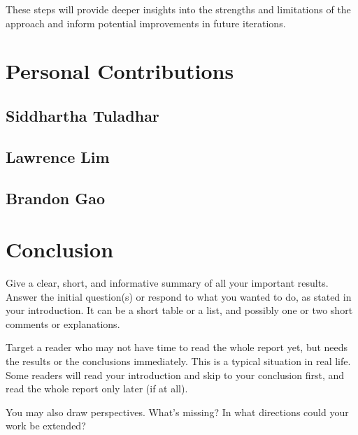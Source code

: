 \documentclass{scrartcl}
\begin{document}
These steps will provide deeper insights into the strengths and limitations of the approach and inform potential improvements in future iterations.


\section{Personal Contributions}

\subsection{Siddhartha Tuladhar}

\subsection{Lawrence Lim}

\subsection{Brandon Gao}

\section{Conclusion}

Give a clear, short, and informative summary of all your important results. Answer the initial question(s) or respond to what you wanted to do, as stated in your introduction. It can be a short table or a list, and possibly one or two short comments or explanations.

Target a reader who may not have time to read the whole report yet, but needs the results or the conclusions immediately. This is a typical situation in real life. Some readers will read your introduction and skip to your conclusion first, and read the whole report only later (if at all).

You may also draw perspectives. What's missing? In what directions could your work be extended?

\newpage
\singlespacing




\end{document}
